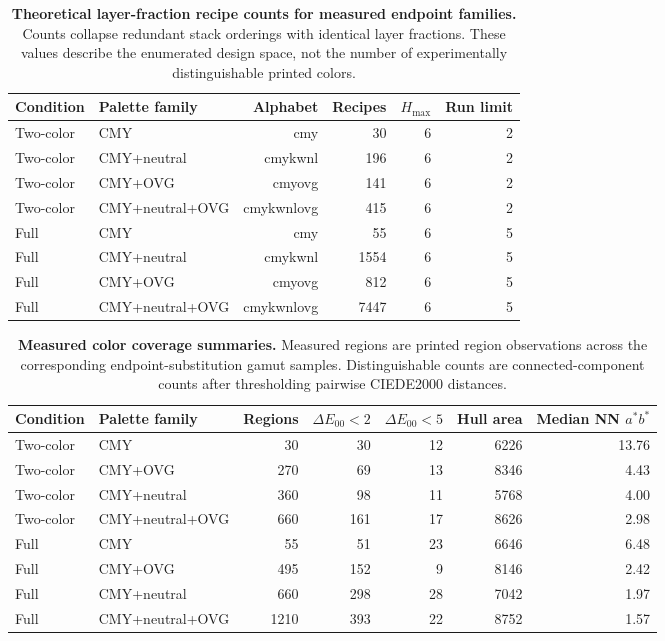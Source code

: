 \documentclass[preprint,12pt,authoryear]{elsarticle}
\begin{document}
\begin{table}[H]
\centering
\caption{\textbf{Theoretical layer-fraction recipe counts for measured endpoint families.}
Counts collapse redundant stack orderings with identical layer fractions. These values describe the enumerated design space, not the number of experimentally distinguishable printed colors.}
\small
\begin{tabular}{llrrrr}
\toprule
Condition & Palette family & Alphabet & Recipes & \(H_{\max}\) & Run limit \\
\midrule
Two-color & CMY & cmy & 30 & 6 & 2 \\
Two-color & CMY+neutral & cmykwnl & 196 & 6 & 2 \\
Two-color & CMY+OVG & cmyovg & 141 & 6 & 2 \\
Two-color & CMY+neutral+OVG & cmykwnlovg & 415 & 6 & 2 \\
Full & CMY & cmy & 55 & 6 & 5 \\
Full & CMY+neutral & cmykwnl & 1554 & 6 & 5 \\
Full & CMY+OVG & cmyovg & 812 & 6 & 5 \\
Full & CMY+neutral+OVG & cmykwnlovg & 7447 & 6 & 5 \\
\bottomrule
\end{tabular}
\label{tab:supp-theoretical-counts}
\end{table}

\begin{table}[H]
\centering
\caption{\textbf{Measured color coverage summaries.}
Measured regions are printed region observations across the corresponding endpoint-substitution gamut samples. Distinguishable counts are connected-component counts after thresholding pairwise CIEDE2000 distances.}
\scriptsize
\setlength{\tabcolsep}{4pt}
\begin{tabular}{llrrrrr}
\toprule
Condition & Palette family & Regions & \(\Delta E_{00}<2\) & \(\Delta E_{00}<5\) & Hull area & Median NN \(a^*b^*\) \\
\midrule
Two-color & CMY & 30 & 30 & 12 & 6226 & 13.76 \\
Two-color & CMY+OVG & 270 & 69 & 13 & 8346 & 4.43 \\
Two-color & CMY+neutral & 360 & 98 & 11 & 5768 & 4.00 \\
Two-color & CMY+neutral+OVG & 660 & 161 & 17 & 8626 & 2.98 \\
Full & CMY & 55 & 51 & 23 & 6646 & 6.48 \\
Full & CMY+OVG & 495 & 152 & 9 & 8146 & 2.42 \\
Full & CMY+neutral & 660 & 298 & 28 & 7042 & 1.97 \\
Full & CMY+neutral+OVG & 1210 & 393 & 22 & 8752 & 1.57 \\
\bottomrule
\end{tabular}
\label{tab:supp-color-summary}
\end{table}
\end{document}
